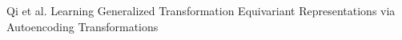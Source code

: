 \documentclass[10pt,journal,compsoc,twoside]{IEEEtran}
\begin{document}
%
%



%
{Qi et al. Learning Generalized Transformation Equivariant Representations via Autoencoding Transformations}
%



\end{document}
